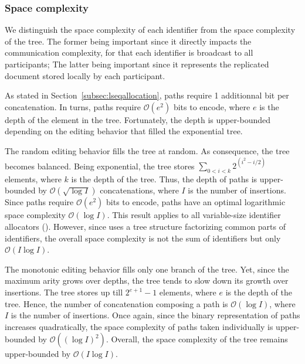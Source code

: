 
\subsubsection{Space complexity}

We distinguish the space complexity of each identifier from the space complexity
of the tree. The former being important since it directly impacts the
communication complexity, for that each identifier is broadcast to all
participants; The latter being important since it represents the replicated
document stored locally by each participant.

As stated in Section~\ref{subsec:lseqallocation}, paths require 1 additionnal
bit per concatenation. In turns, paths require $\mathcal{O}(e^2)$ bits to
encode, where $e$ is the depth of the element in the tree. Fortunately, the
depth is upper-bounded depending on the editing behavior that filled the
exponential tree.

The random editing behavior fills the tree at random. As consequence, the tree
becomes balanced. Being exponential, the tree stores
$\sum\limits_{0<i<k}{2^{(i^2-i/2)}}$ elements, where $k$ is the depth of the
tree. Thus, the depth of paths is upper-bounded by $\mathcal{O}(\sqrt{\log I})$
concatenations, where $I$ is the number of insertions. Since paths require
$\mathcal{O}(e^2)$ bits to encode, paths have an optimal logarithmic space
complexity $\mathcal{O}(\log I)$. This result applies to all variable-size
identifier allocators (\REF). However, since \LSEQ uses a tree structure
factorizing common parts of identifiers, the overall space complexity is not the
sum of identifiers but only $\mathcal{O}(I\log I)$.

The monotonic editing behavior fills only one branch of the tree. Yet, since the
maximum arity grows over depths, the tree tends to slow down its growth over
insertions. The tree stores up till $2^{e+1}-1$ elements, where $e$ is the depth
of the tree. Hence, the number of concatenation composing a path is
$\mathcal{O}(\log I)$, where $I$ is the number of insertions. Once again, since
the binary representation of paths increases quadratically, the space complexity
of paths taken individually is upper-bounded by $\mathcal{O}((\log I)^2)$.
Overall, the space complexity of the tree remains upper-bounded by
$\mathcal{O}(I\log I)$.

